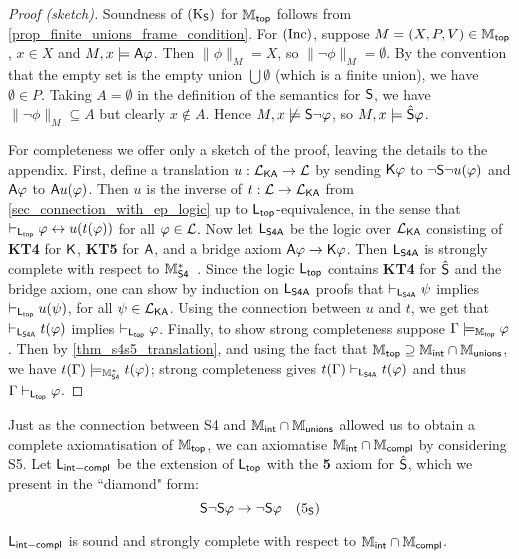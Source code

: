 \begin{proof}[Proof (sketch)]

    Soundness of $\Ksoundness$ for $\Mtop$ follows from
    \cref{prop_finite_unions_frame_condition}. For $\inc$, suppose $M = (X, P,
    V) \in \Mtop$, $x \in X$ and $M, x \models \A\phi$. Then $\|\phi\|_M = X$,
    so $\|\neg\phi\|_M = \emptyset$. By the convention that the empty set is
    the empty union $\bigcup\emptyset$ (which is a finite union), we have
    $\emptyset \in P$. Taking $A = \emptyset$ in the definition of the
    semantics for $\S$, we have $\|\neg\phi\|_M \subseteq A$ but clearly $x
    \notin A$. Hence $M, x \not\models \S\neg\phi$, so $M, x \models
    \hat\S\phi$.

    For completeness we offer only a sketch of the proof, leaving the details
    to the appendix. First, define a translation $u: \cLKA \to \cL$ by sending
    $\K\phi$ to $\neg\S\neg u(\phi)$ and $\A\phi$ to $\A u(\phi)$. Then $u$ is
    the inverse of $t: \cL \to \cLKA$ from \cref{sec_connection_with_ep_logic}
    up to $\sLtop$-equivalence, in the sense that $\entails_{\sLtop} \phi \liff
    u(t(\phi))$ for all $\phi \in \cL$. Now let $\sLsfoura$ be the logic over
    $\cLKA$ consisting of \textbf{KT4} for $\K$, \textbf{KT5} for $\A$, and a
    bridge axiom $\A\phi \limplies \K\phi$. Then $\sLsfoura$ is strongly
    complete with respect to $\Msfour$~\citep[Theorem 7.2]{blackburn2002modal}.
    Since the logic
    $\sLtop$ contains \textbf{KT4} for $\hat\S$ and the bridge axiom, one can
    show by induction on $\sLsfoura$ proofs that $\entails_{\sLsfoura}\psi$
    implies $\entails_{\sLtop}u(\psi)$, for all $\psi \in \cLKA$. Using the
    connection between $u$ and $t$, we get that $\entails_{\sLsfoura}t(\phi)$
    implies $\entails_{\sLtop}\phi$. Finally, to show strong completeness
    suppose $\Gamma \models_{\Mtop} \phi$. Then by \cref{thm_s4s5_translation},
    and using the fact that $\Mtop \supseteq \Mint \cap \Munions$, we have
    $t(\Gamma) \models_{\Msfour} t(\phi)$; strong completeness gives $t(\Gamma)
    \entails_{\sLsfoura} t(\phi)$ and thus $\Gamma \entails_{\sLtop} \phi$.

\end{proof}

Just as the connection between S4 and $\Mint \cap \Munions$ allowed us
to obtain a complete axiomatisation of $\Mtop$, we can axiomatise $\Mint \cap
\Mcompl$ by considering S5. Let $\sLintcompl$ be the extension of $\sLtop$
with the \textbf{5} axiom for $\hat\S$, which we present in the ``diamond"
form:
\[
\S\neg\S\phi \limplies \neg\S\phi
\quad
\fivesoundness\]
\begin{theorem}
\label{thm_mintcompl_axiomatisation}
$\sLintcompl$ is sound and strongly complete with respect to
$\Mint \cap \Mcompl$.
\end{theorem}

